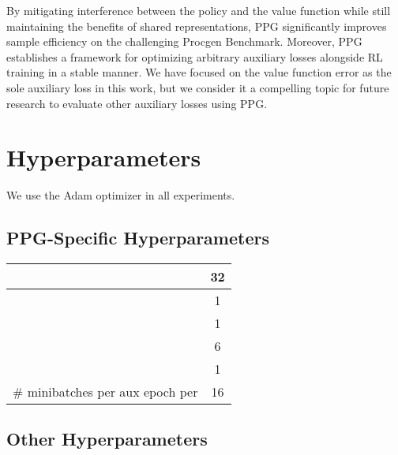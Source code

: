 \documentclass{article}
\newcommand{\changeurlcolor}[1]{\hypersetup{urlcolor=#1}}
\begin{document}
By mitigating interference between the policy and the value function while still maintaining the benefits of shared representations, PPG significantly improves sample efficiency on the challenging Procgen Benchmark. Moreover, PPG establishes a framework for optimizing arbitrary auxiliary losses alongside RL training in a stable manner. We have focused on the value function error as the sole auxiliary loss in this work, but we consider it a compelling topic for future research to evaluate other auxiliary losses using PPG.

\changeurlcolor{black}



\changeurlcolor{blue}

\appendix

\clearpage

\section{Hyperparameters} \label{appendix:hyperparameters}

We use the Adam optimizer \citep{kingma2014adam} in all experiments.

\subsection{PPG-Specific Hyperparameters}

\begin{center}
 \begin{tabular}{||c c||} 
 \hline
  & 32 \\ 
 \hline
  & 1 \\
 \hline
  & 1 \\
 \hline
  & 6 \\ 
 \hline
  & 1 \\
 \hline
 \# minibatches per aux epoch per  & 16 \\
 \hline
\end{tabular}
\end{center}

\subsection{Other Hyperparameters}
\end{document}
